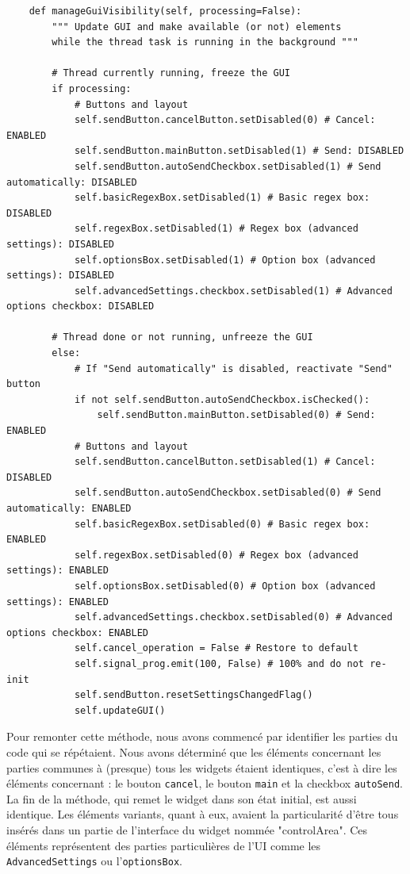 \documentclass{article}
\begin{document}
\begin{verbatim}
    def manageGuiVisibility(self, processing=False):
        """ Update GUI and make available (or not) elements
        while the thread task is running in the background """

        # Thread currently running, freeze the GUI
        if processing:
            # Buttons and layout
            self.sendButton.cancelButton.setDisabled(0) # Cancel: ENABLED
            self.sendButton.mainButton.setDisabled(1) # Send: DISABLED
            self.sendButton.autoSendCheckbox.setDisabled(1) # Send automatically: DISABLED
            self.basicRegexBox.setDisabled(1) # Basic regex box: DISABLED
            self.regexBox.setDisabled(1) # Regex box (advanced settings): DISABLED
            self.optionsBox.setDisabled(1) # Option box (advanced settings): DISABLED
            self.advancedSettings.checkbox.setDisabled(1) # Advanced options checkbox: DISABLED

        # Thread done or not running, unfreeze the GUI
        else:
            # If "Send automatically" is disabled, reactivate "Send" button
            if not self.sendButton.autoSendCheckbox.isChecked():
                self.sendButton.mainButton.setDisabled(0) # Send: ENABLED
            # Buttons and layout
            self.sendButton.cancelButton.setDisabled(1) # Cancel: DISABLED
            self.sendButton.autoSendCheckbox.setDisabled(0) # Send automatically: ENABLED
            self.basicRegexBox.setDisabled(0) # Basic regex box: ENABLED
            self.regexBox.setDisabled(0) # Regex box (advanced settings): ENABLED
            self.optionsBox.setDisabled(0) # Option box (advanced settings): ENABLED
            self.advancedSettings.checkbox.setDisabled(0) # Advanced options checkbox: ENABLED
            self.cancel_operation = False # Restore to default
            self.signal_prog.emit(100, False) # 100% and do not re-init
            self.sendButton.resetSettingsChangedFlag()
            self.updateGUI()
\end{verbatim}

Pour remonter cette méthode, nous avons commencé par identifier les parties du code qui se répétaient. Nous avons déterminé que les éléments concernant les parties communes à (presque) tous les widgets étaient identiques, c'est à dire les éléments concernant : le bouton \texttt{cancel}, le bouton \texttt{main} et la checkbox \texttt{autoSend}. La fin de la méthode, qui remet le widget dans son état initial, est aussi identique.
Les éléments variants, quant à eux, avaient la particularité d'être tous insérés dans un partie de l'interface du widget nommée "controlArea". Ces éléments représentent des parties particulières de l'UI comme les \texttt{AdvancedSettings} ou l'\texttt{optionsBox}. 
\end{document}
